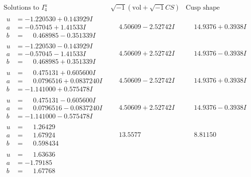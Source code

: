 \documentclass[1p]{elsarticle_modified}
\theoremstyle{definition}
\newcommand{\I}{\sqrt{-1}}
\begin{document}
$$\begin{array}{c|c|c}  
\text{Solutions to }I^u_{4}& \I (\text{vol} + \sqrt{-1}CS) & \text{Cusp shape}\\
 \hline 
\begin{aligned}
u &= -1.220530 + 0.143929 I \\
a &= -0.57045 + 1.41533 I \\
b &= \phantom{-}0.468985 - 0.351339 I\end{aligned}
 & \phantom{-}4.50609 - 2.52742 I & \phantom{-}14.9376 + 0.3938 I \\ \hline\begin{aligned}
u &= -1.220530 - 0.143929 I \\
a &= -0.57045 - 1.41533 I \\
b &= \phantom{-}0.468985 + 0.351339 I\end{aligned}
 & \phantom{-}4.50609 + 2.52742 I & \phantom{-}14.9376 - 0.3938 I \\ \hline\begin{aligned}
u &= \phantom{-}0.475131 + 0.605600 I \\
a &= \phantom{-}0.0796516 + 0.0837240 I \\
b &= -1.141000 + 0.575478 I\end{aligned}
 & \phantom{-}4.50609 - 2.52742 I & \phantom{-}14.9376 + 0.3938 I \\ \hline\begin{aligned}
u &= \phantom{-}0.475131 - 0.605600 I \\
a &= \phantom{-}0.0796516 - 0.0837240 I \\
b &= -1.141000 - 0.575478 I\end{aligned}
 & \phantom{-}4.50609 + 2.52742 I & \phantom{-}14.9376 - 0.3938 I \\ \hline\begin{aligned}
u &= \phantom{-}1.26429\phantom{ +0.000000I} \\
a &= \phantom{-}1.67924\phantom{ +0.000000I} \\
b &= \phantom{-}0.598434\phantom{ +0.000000I}\end{aligned}
 & \phantom{-}13.5577\phantom{ +0.000000I} & \phantom{-}8.81150\phantom{ +0.000000I} \\ \hline\begin{aligned}
u &= \phantom{-}1.63636\phantom{ +0.000000I} \\
a &= -1.79185\phantom{ +0.000000I} \\
b &= \phantom{-}1.67768\phantom{ +0.000000I}\end{aligned}

\end{array}$$
\end{document}
